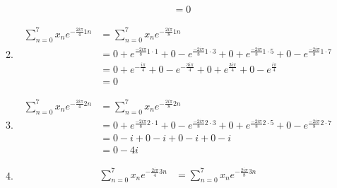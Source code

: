 \documentclass{article}
\begin{document}
\begin{enumerate}[label=\Alph*)]
\begin{enumerate}[label={k=\arabic*}, start=0]
\begin{align*}
                                                                           & = 0
                        \end{align*}
                  \item \begin{align*}
                              \sum_{n=0}^{7}{x_n e^{-\frac{2 i \pi}{4}1n}} & = \sum_{n=0}^{7}{x_n e^{-\frac{2 i \pi}{8}1n}}                                                                                                              \\
                                                                           & = 0 + e^{\frac{-2 i \pi}{8} 1 \cdot 1} + 0 - e^{\frac{-2 i \pi}{8} 1 \cdot 3} + 0 + e^{\frac{-2 i \pi}{8} 1 \cdot 5} + 0 - e^{\frac{-2 i \pi}{8} 1 \cdot 7} \\
                                                                           & = 0 + e^{-\frac{i \pi}{4}} + 0 - e^{-\frac{3 i \pi}{4}} + 0 + e^{\frac{3 i \pi}{4}} + 0 - e^{\frac{i \pi}{4}}                                               \\
                                                                           & = 0
                        \end{align*}
                  \item \begin{align*}
                              \sum_{n=0}^{7}{x_n e^{-\frac{2 i \pi}{4}2n}} & = \sum_{n=0}^{7}{x_n e^{-\frac{2 i \pi}{8}2n}}                                                                                                              \\
                                                                           & = 0 + e^{\frac{-2 i \pi}{8} 2 \cdot 1} + 0 - e^{\frac{-2 i \pi}{8} 2 \cdot 3} + 0 + e^{\frac{-2 i \pi}{8} 2 \cdot 5} + 0 - e^{\frac{-2 i \pi}{8} 2 \cdot 7} \\
                                                                           & = 0 - i + 0 - i + 0 - i + 0 - i                                                                                                                             \\
                                                                           & = 0 - 4i
                        \end{align*}
                  \item \begin{align*}
                              \sum_{n=0}^{7}{x_n e^{-\frac{2 i \pi}{4}3n}} & = \sum_{n=0}^{7}{x_n e^{-\frac{2 i \pi}{8}3n}}                                                                                                              \\

\end{align*}
\end{enumerate}
\end{enumerate}
\end{document}

